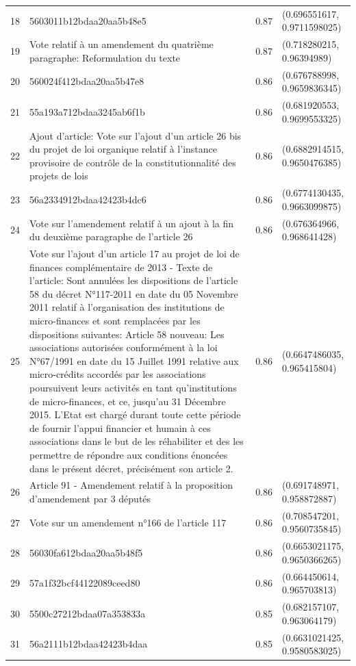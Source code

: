 \begin{table}[ht]
\begin{tabular}{rlrl}
  18 & 5603011b12bdaa20aa5b48e5 & 0.87 & (0.696551617, 0.9711598025) \\ 
  19 & Vote relatif à un amendement du quatrième paragraphe: Reformulation du texte & 0.87 & (0.718280215, 0.96394989) \\ 
  20 & 560024f412bdaa20aa5b47e8 & 0.86 & (0.676788998, 0.9659836345) \\ 
  21 & 55a193a712bdaa3245ab6f1b & 0.86 & (0.681920553, 0.9699553325) \\ 
  22 & Ajout d'article: Vote sur l'ajout d'un article 26 bis du projet de loi organique relatif à l'instance provisoire de contrôle de la constitutionnalité des projets de lois & 0.86 & (0.6882914515, 0.9650476385) \\ 
  23 & 56a2334912bdaa42423b4dc6 & 0.86 & (0.6774130435, 0.9663099875) \\ 
  24 & Vote sur l'amendement relatif à un ajout à la fin du deuxième paragraphe de l'article 26 & 0.86 & (0.676364966, 0.968641428) \\ 
  25 & Vote sur l'ajout d'un article 17 au projet de loi de finances complémentaire de 2013 - Texte de l'article: Sont annulées les dispositions de l'article 58 du décret N°117-2011 en date du 05 Novembre 2011 relatif à l'organisation des institutions de micro-finances et sont remplacées par les dispositions suivantes: Article 58 nouveau: Les associations autorisées conformément à la loi N°67/1991 en date du 15 Juillet 1991 relative aux micro-crédits accordés par les associations poursuivent leurs activités en tant qu'institutions de micro-finances, et ce, jusqu'au 31 Décembre 2015. L'Etat est chargé durant toute cette période de fournir l'appui financier et humain à ces associations dans le but de les réhabiliter et des les permettre de répondre aux conditions énoncées dans le présent décret, précisément son article 2. & 0.86 & (0.6647486035, 0.965415804) \\ 
  26 & Article 91 - Amendement relatif à la proposition d'amendement par 3 députés & 0.86 & (0.691748971, 0.958872887) \\ 
  27 & Vote sur un amendement n°166 de l'article 117 & 0.86 & (0.708547201, 0.9560735845) \\ 
  28 & 56030fa612bdaa20aa5b48f5 & 0.86 & (0.6653021175, 0.9650366265) \\ 
  29 & 57a1f32bcf44122089ceed80 & 0.86 & (0.664450614, 0.965703813) \\ 
  30 & 5500c27212bdaa07a353833a & 0.85 & (0.682157107, 0.963064179) \\ 
  31 & 56a2111b12bdaa42423b4daa & 0.85 & (0.6631021425, 0.9580583025) \\ 

\end{tabular}
\end{table}
